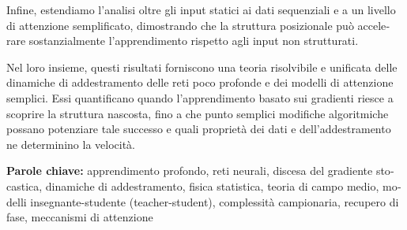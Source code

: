 \begin{otherlanguage}{italian}
\begin{noparskip}
Infine, estendiamo l'analisi oltre gli input statici ai dati sequenziali e a un livello di attenzione semplificato, dimostrando che la struttura posizionale può accelerare sostanzialmente l'apprendimento rispetto agli input non strutturati.

Nel loro insieme, questi risultati forniscono una teoria risolvibile e unificata delle dinamiche di addestramento delle reti poco profonde e dei modelli di attenzione semplici. Essi quantificano quando l'apprendimento basato sui gradienti riesce a scoprire la struttura nascosta, fino a che punto semplici modifiche algoritmiche possano potenziare tale successo e quali proprietà dei dati e dell'addestramento ne determinino la velocità.

\end{noparskip}
\textbf{Parole chiave:} apprendimento profondo, reti neurali, discesa del gradiente stocastica, dinamiche di addestramento, fisica statistica, teoria di campo medio, modelli insegnante-studente (teacher-student), complessità campionaria, recupero di fase, meccanismi di attenzione
\end{otherlanguage}
